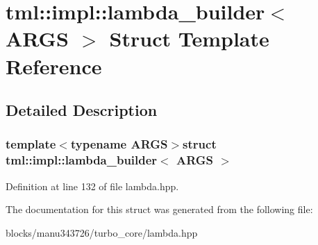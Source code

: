 \hypertarget{structtml_1_1impl_1_1lambda__builder}{\section{tml\+:\+:impl\+:\+:lambda\+\_\+builder$<$ A\+R\+G\+S $>$ Struct Template Reference}
\label{structtml_1_1impl_1_1lambda__builder}
}


\subsection{Detailed Description}
\subsubsection*{template$<$typename A\+R\+G\+S$>$struct tml\+::impl\+::lambda\+\_\+builder$<$ A\+R\+G\+S $>$}



Definition at line 132 of file lambda.\+hpp.



The documentation for this struct was generated from the following file\+:\begin{DoxyCompactItemize}
\item 
blocks/manu343726/turbo\+\_\+core/lambda.\+hpp\end{DoxyCompactItemize}
